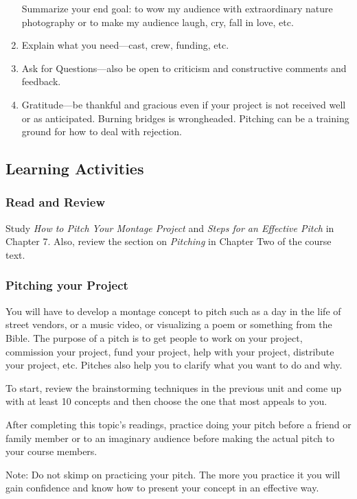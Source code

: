 \documentclass[
]{book}
\begin{document}
\begin{enumerate}
  Summarize your end goal: to wow my audience with extraordinary nature photography or to make my audience laugh, cry, fall in love, etc.\\
\item
  Explain what you need---cast, crew, funding, etc.\\
\item
  Ask for Questions---also be open to criticism and constructive comments and feedback.\\
\item
  Gratitude---be thankful and gracious even if your project is not received well or as anticipated. Burning bridges is wrongheaded. Pitching can be a training ground for how to deal with rejection.
\end{enumerate}

\hypertarget{learning-activities-3}{%
\subsection*{Learning Activities}\label{learning-activities-3}}

\begin{reflect}
\hypertarget{read-and-review}{%
\subsubsection*{Read and Review}\label{read-and-review}}

Study \emph{How to Pitch Your Montage Project} and \emph{Steps for an Effective Pitch} in Chapter 7. Also, review the section on \emph{Pitching }in Chapter Two of the course text.

\hypertarget{pitching-your-project}{%
\subsubsection*{Pitching your Project}\label{pitching-your-project}}

You will have to develop a montage concept to pitch such as a day in the life of street vendors, or a music video, or visualizing a poem or something from the Bible. The purpose of a pitch is to get people to work on your project, commission your project, fund your project, help with your project, distribute your project, etc. Pitches also help you to clarify what you want to do and why.

To start, review the brainstorming techniques in the previous unit and come up with at least 10 concepts and then choose the one that most appeals to you.

After completing this topic's readings, practice doing your pitch before a friend or family member or to an imaginary audience before making the actual pitch to your course members.

Note: Do not skimp on practicing your pitch. The more you practice it you will gain confidence and know how to present your concept in an effective way.
\end{reflect}
\end{document}
